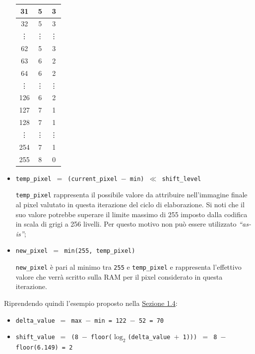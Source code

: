 \documentclass{article}
\begin{document}
\begin{itemize}
\begin{table}[h]
\begin{tabular}{||c|c|c||}
                    31      & 5         & 3         \\\hline
                    32      & 5         & 3         \\\hline
                    \vdots  & \vdots    & \vdots    \\\hline
                    62      & 5         & 3         \\\hline
                    63      & 6         & 2         \\\hline
                    64      & 6         & 2         \\\hline
                    \vdots  & \vdots    & \vdots    \\\hline
                    126     & 6         & 2         \\\hline
                    127     & 7         & 1         \\\hline
                    128     & 7         & 1         \\\hline
                    \vdots  & \vdots    & \vdots    \\\hline
                    254     & 7         & 1         \\\hline
                    255     & 8         & 0         \\\hline
                \end{tabular}
            \end{table}
            \vspace{0,2cm}

    \item   \texttt{temp\_pixel $=$ (current\_pixel $-$ min) $\ll$ shift\_level}\par
            \texttt{temp\_pixel} rappresenta il possibile valore da attribuire nell’immagine finale al pixel valutato in questa iterazione del ciclo di elaborazione. Si noti che il suo valore potrebbe superare il limite massimo di 255 imposto dalla codifica in scala di grigi a 256 livelli. Per questo motivo non può essere utilizzato \emph{“as-is”};
    \item   \texttt{new\_pixel $=$ min(255, temp\_pixel)}\par
            \texttt{new\_pixel} è pari al minimo tra \texttt{255} e \texttt{temp\_pixel} e rappresenta l’effettivo valore che verrà scritto sulla RAM per il pixel considerato in questa iterazione.
\end{itemize}

Riprendendo quindi l'esempio proposto nella \hyperref[sec:esempio]{Sezione 1.4}:
\begin{itemize}
    \item   \texttt{delta\_value $=$ max $-$ min = 122 $-$ 52 = 70}
    \item   \texttt{shift\_value $=$ (8 $-$ floor($\log_{2} $(delta\_value $+$ 1))) $=$ 8 $-$ floor(6.149) = 2}
\end{itemize}
\end{document}
